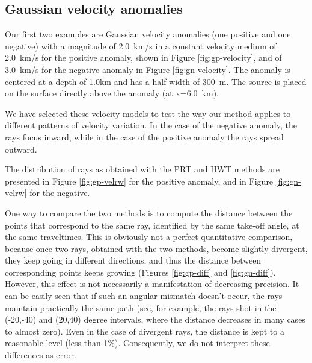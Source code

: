 \subsection{Gaussian velocity anomalies}
Our first two examples are Gaussian velocity anomalies (one positive and
one negative) with a magnitude of \mbox{2.0 km/s} in a constant velocity medium
of \mbox{2.0 km/s} for the positive anomaly, shown in Figure \ref{fig:gp-velocity},
and of \mbox{3.0 km/s} for the negative anomaly in Figure \ref{fig:gn-velocity}.
The anomaly is centered at a depth of 1.0km and has a half-width of \mbox{300 m}. The
source is placed on the surface directly above the anomaly (at \mbox{x=6.0 km}).


\par
We have selected these velocity models to test the way our method applies
to different patterns of velocity variation. In the case of the
negative anomaly, the rays focus inward, while in the case of the
positive anomaly the rays spread outward.
\par
The distribution of rays as obtained with the PRT and HWT methods are
presented in Figure \ref{fig:gp-velrw} for the positive anomaly, and in
Figure \ref{fig:gn-velrw} for the negative.


\par
One way to compare the two methods is to compute the distance between the
points that correspond to the same ray, identified by the same take-off
angle, at the same traveltimes. This is obviously not a perfect
quantitative comparison, because once two rays, obtained with the two 
methods, become slightly divergent, they keep going in different
directions, and thus the distance between corresponding points keeps
growing (Figures \ref{fig:gp-diff} and \ref{fig:gn-diff}). However, this
effect is not necessarily a manifestation of decreasing precision. It can
be easily seen that if such an angular mismatch doesn't occur, the rays
maintain practically the same path (see, for example, the rays shot in
the (-20,-40) and (20,40) degree intervals, where the distance decreases
in many cases to almost zero).  Even in the case of divergent rays, the
distance is kept to a reasonable level (less than 1\%). Consequently, we
do not interpret these differences as error.

